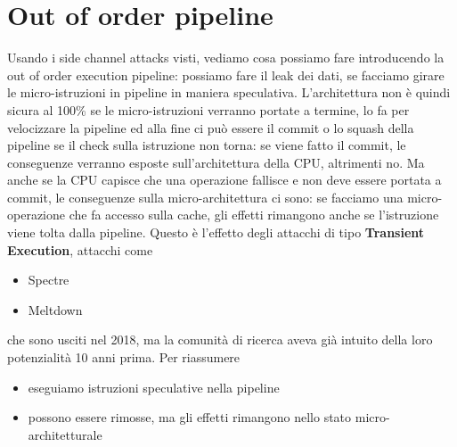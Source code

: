 \documentclass[12pt, oneside]{extbook} %
\begin{document}
\section{Out of order pipeline}
Usando i side channel attacks visti, vediamo cosa possiamo fare introducendo la out of order execution pipeline: possiamo fare il leak dei dati, se facciamo girare le micro-istruzioni in pipeline in maniera speculativa. L'architettura non è quindi sicura al 100\% se le micro-istruzioni verranno portate a termine, lo fa per velocizzare la pipeline ed alla fine ci può essere il commit o lo squash della pipeline se il check sulla istruzione non torna: se viene fatto il commit, le conseguenze verranno esposte sull'architettura della CPU, altrimenti no. Ma anche se la CPU capisce che una operazione fallisce e non deve essere portata a commit, le conseguenze sulla micro-architettura ci sono: se facciamo una micro-operazione che fa accesso sulla cache, gli effetti rimangono anche se l'istruzione viene tolta dalla pipeline. Questo è l'effetto degli attacchi di tipo \textbf{Transient Execution}, attacchi come
\begin{itemize}
\item Spectre
\item Meltdown
\end{itemize}
che sono usciti nel 2018, ma la comunità di ricerca aveva già intuito della loro potenzialità 10 anni prima. Per riassumere
\begin{itemize}
\item eseguiamo istruzioni speculative nella pipeline
\item possono essere rimosse, ma gli effetti rimangono nello stato micro-architetturale
\end{itemize}
\end{document}

